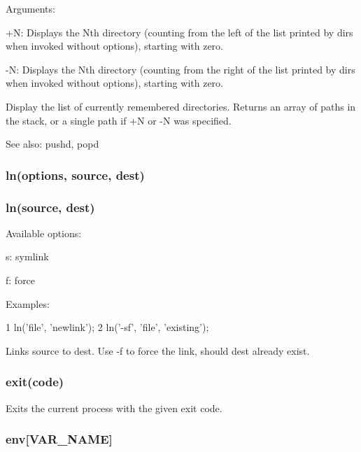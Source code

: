 Arguments\+:


\begin{DoxyItemize}
\item {\ttfamily +\+N}\+: Displays the Nth directory (counting from the left of the list printed by dirs when invoked without options), starting with zero.
\item {\ttfamily -\/\+N}\+: Displays the Nth directory (counting from the right of the list printed by dirs when invoked without options), starting with zero.
\end{DoxyItemize}

Display the list of currently remembered directories. Returns an array of paths in the stack, or a single path if +\+N or -\/\+N was specified.

See also\+: pushd, popd

\subsubsection*{ln(options, source, dest)}

\subsubsection*{ln(source, dest)}

Available options\+:


\begin{DoxyItemize}
\item {\ttfamily s}\+: symlink
\item {\ttfamily f}\+: force
\end{DoxyItemize}

Examples\+:


\begin{DoxyCode}
1 ln('file', 'newlink');
2 ln('-sf', 'file', 'existing');
\end{DoxyCode}


Links source to dest. Use -\/f to force the link, should dest already exist.

\subsubsection*{exit(code)}

Exits the current process with the given exit code.

\subsubsection*{env\mbox{[}\textquotesingle{}V\+A\+R\+\_\+\+N\+A\+M\+E\textquotesingle{}\mbox{]}}


